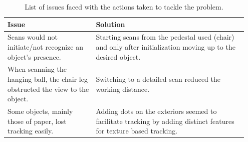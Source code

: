 \documentclass[12pt,a4paper]{article}
\begin{document}
\renewcommand{\arraystretch}{2}
\begin{table}[h]

  \centering
  \begin{tabular}{ | p{0.35\linewidth} | p{0.6\linewidth} | }
    \hline
    Issue & Solution \\
    \hline
    Scans would not initiate/not recognize an object's presence. & Starting
    scans from the pedestal used (chair) and only after initialization moving up
    to the desired object. \\
    When scanning the hanging ball, the chair leg obstructed the view to the
    object. & Switching to a detailed scan reduced the working distance.\\
    Some objects, mainly those of paper, lost tracking easily. & Adding dots on
    the exteriors seemed to facilitate tracking by adding distinct features for
    texture based tracking.\\
    \hline
  \end{tabular}
  \caption{List of issues faced with the actions taken to tackle the problem.}
\end{table}
\end{document}
